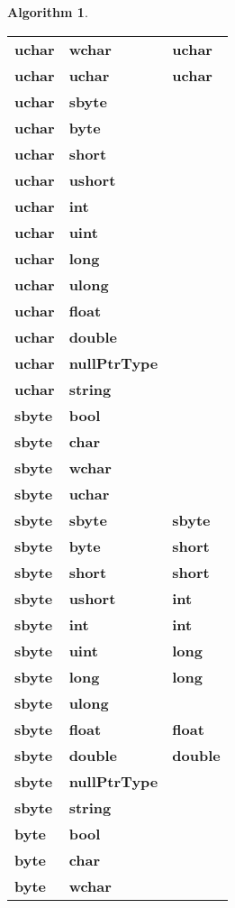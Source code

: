\documentclass[a4paper,oneside,11pt]{book}
\theoremstyle{definition}
\newtheorem{algo}{Algorithm}[section]
\begin{document}
\begin{algo}
\begin{flushleft}
\begin{supertabular}{lll}
\textbf{uchar}& \textbf{wchar}& \textbf{uchar}\\
\textbf{uchar}& \textbf{uchar}& \textbf{uchar}\\
\textbf{uchar}& \textbf{sbyte}& \\
\textbf{uchar}& \textbf{byte}& \\
\textbf{uchar}& \textbf{short}& \\
\textbf{uchar}& \textbf{ushort}& \\
\textbf{uchar}& \textbf{int}& \\
\textbf{uchar}& \textbf{uint}& \\
\textbf{uchar}& \textbf{long}& \\
\textbf{uchar}& \textbf{ulong}& \\
\textbf{uchar}& \textbf{float}& \\
\textbf{uchar}& \textbf{double}& \\
\textbf{uchar}& \textbf{nullPtrType}& \\
\textbf{uchar}& \textbf{string}& \\
\hline
\textbf{sbyte}& \textbf{bool}&\\
\textbf{sbyte}& \textbf{char}& \\
\textbf{sbyte}& \textbf{wchar}& \\
\textbf{sbyte}& \textbf{uchar}& \\
\textbf{sbyte}& \textbf{sbyte}& \textbf{sbyte}\\
\textbf{sbyte}& \textbf{byte}& \textbf{short}\\
\textbf{sbyte}& \textbf{short}& \textbf{short}\\
\textbf{sbyte}& \textbf{ushort}& \textbf{int}\\
\textbf{sbyte}& \textbf{int}& \textbf{int}\\
\textbf{sbyte}& \textbf{uint}& \textbf{long}\\
\textbf{sbyte}& \textbf{long}& \textbf{long}\\
\textbf{sbyte}& \textbf{ulong}& \\
\textbf{sbyte}& \textbf{float}& \textbf{float}\\
\textbf{sbyte}& \textbf{double}& \textbf{double}\\
\textbf{sbyte}& \textbf{nullPtrType}& \\
\textbf{sbyte}& \textbf{string}& \\
\hline
\textbf{byte}& \textbf{bool}& \\
\textbf{byte}& \textbf{char}& \\
\textbf{byte}& \textbf{wchar}& \\

\end{supertabular}
\end{flushleft}
\end{algo}
\end{document}
